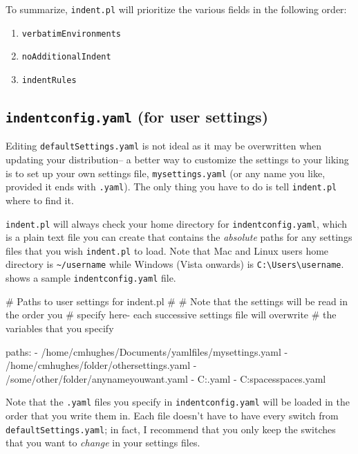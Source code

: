  	To summarize, \lstinline!indent.pl! will prioritize the various fields in the 
 	following order:
 	\begin{enumerate}
 		\item \lstinline!verbatimEnvironments!
 		\item \lstinline!noAdditionalIndent!
 		\item \lstinline!indentRules!
 	\end{enumerate}
 \subsection{\lstinline!indentconfig.yaml! (for user settings)}\label{sec:indentconfig}
 	Editing \lstinline!defaultSettings.yaml! is not ideal as it may be overwritten when 
 	updating your distribution-- a better way to customize the settings to your liking 
 	is to set up your own settings file, 
 	\lstinline!mysettings.yaml! (or any name you like, provided it ends with \lstinline!.yaml!). 
 	The only thing you have to do is tell \lstinline!indent.pl! where to find it. 
 	 	 	 	 	
 	\lstinline!indent.pl! will always check your home directory for \lstinline!indentconfig.yaml!, 
 	which is a plain text file you can create that contains the \emph{absolute}
 	paths for any settings files that you wish \lstinline!indent.pl! to load.
 	Note that Mac and Linux users home directory is \lstinline!~/username! while
 	Windows (Vista onwards) is \lstinline!C:\Users\username!. 
 	 shows a sample \lstinline!indentconfig.yaml! file.
 	 	 	 	 	
 	\begin{yaml}[caption={\lstinline!indentconfig.yaml!},label={lst:indentconfig}]
# Paths to user settings for indent.pl
#
# Note that the settings will be read in the order you 
# specify here- each successive settings file will overwrite
# the variables that you specify

paths:
- /home/cmhughes/Documents/yamlfiles/mysettings.yaml
- /home/cmhughes/folder/othersettings.yaml
- /some/other/folder/anynameyouwant.yaml
- C:\Users\chughes\Documents\mysettings.yaml
- C:\Users\chughes\Desktop\test spaces\more spaces.yaml
 	\end{yaml}
 	 	 	 	 	
 	Note that the \lstinline!.yaml! files you specify in \lstinline!indentconfig.yaml!
 	will be loaded in the order that you write them in. Each file doesn't have 
 	to have every switch from \lstinline!defaultSettings.yaml!; in fact, I recommend 
 	that you only keep the switches that you want to \emph{change} in your 
 	settings files.
 	 	 	 	 	
